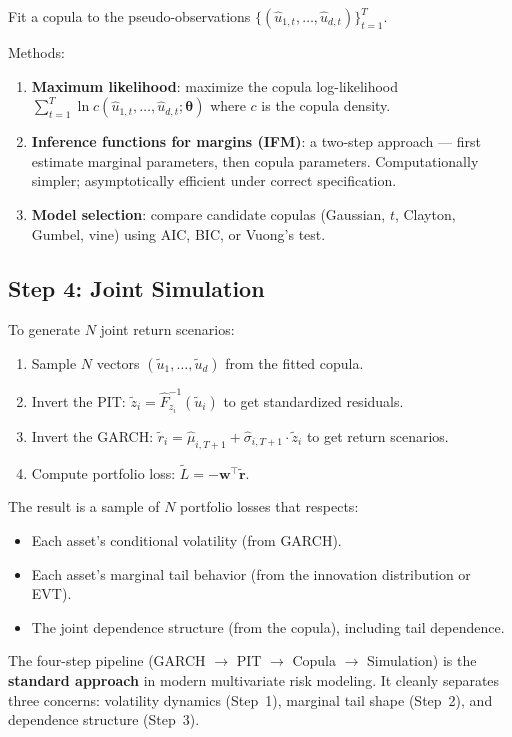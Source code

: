 \documentclass[11pt, a4paper]{article}
\theoremstyle{definition}
\theoremstyle{plain}
\theoremstyle{remark}
\begin{document}
Fit a copula to the pseudo-observations $\{(\hat{u}_{1,t}, \ldots, \hat{u}_{d,t})\}_{t=1}^T$.

Methods:
\begin{enumerate}
    \item \textbf{Maximum likelihood}: maximize the copula log-likelihood
    $\sum_{t=1}^T \ln c(\hat{u}_{1,t}, \ldots, \hat{u}_{d,t}; \bm{\theta})$
    where $c$ is the copula density.
    \item \textbf{Inference functions for margins (IFM)}: a two-step approach ---
    first estimate marginal parameters, then copula parameters.
    Computationally simpler; asymptotically efficient under correct specification.
    \item \textbf{Model selection}: compare candidate copulas (Gaussian, $t$, Clayton, Gumbel, vine)
    using AIC, BIC, or Vuong's test.
\end{enumerate}

\subsection{Step 4: Joint Simulation}

To generate $N$ joint return scenarios:
\begin{enumerate}
    \item Sample $N$ vectors $(\tilde{u}_1, \ldots, \tilde{u}_d)$ from the fitted copula.
    \item Invert the PIT: $\tilde{z}_i = \hat{F}_{z_i}^{-1}(\tilde{u}_i)$ to get standardized residuals.
    \item Invert the GARCH: $\tilde{r}_{i} = \hat\mu_{i, T+1} + \hat\sigma_{i, T+1} \cdot \tilde{z}_i$ to get return scenarios.
    \item Compute portfolio loss: $\tilde{L} = -\bm{w}^\top \tilde{\bm{r}}$.
\end{enumerate}

The result is a sample of $N$ portfolio losses that respects:
\begin{itemize}
    \item Each asset's conditional volatility (from GARCH).
    \item Each asset's marginal tail behavior (from the innovation distribution or EVT).
    \item The joint dependence structure (from the copula), including tail dependence.
\end{itemize}

\begin{keyidea}
The four-step pipeline (GARCH $\to$ PIT $\to$ Copula $\to$ Simulation) is the \textbf{standard approach}
in modern multivariate risk modeling.
It cleanly separates three concerns:
volatility dynamics (Step~1), marginal tail shape (Step~2), and dependence structure (Step~3).
\end{keyidea}
\end{document}
